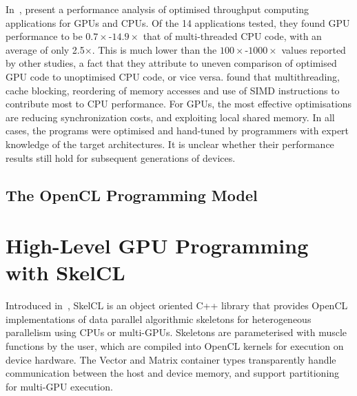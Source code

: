 In~\cite{Lee2010}, \citeauthor{Lee2010} present a performance analysis
of optimised throughput computing applications for GPUs and CPUs. Of
the 14 applications tested, they found GPU performance to be
$0.7\times$-$14.9\times$ that of multi-threaded CPU code, with an
average of only 2.5$\times$. This is much lower than the
$100\times$-$1000\times$ values reported by other studies,
a fact that they attribute to uneven comparison of optimised GPU code
to unoptimised CPU code, or vice versa. \citeauthor{Lee2010} found
that multithreading, cache blocking, reordering of memory accesses and
use of SIMD instructions to contribute most to CPU performance. For
GPUs, the most effective optimisations are reducing synchronization
costs, and exploiting local shared memory. In all cases, the programs
were optimised and hand-tuned by programmers with expert knowledge of
the target architectures. It is unclear whether their performance
results still hold for subsequent generations of devices.


\subsection{The OpenCL Programming Model}



\section{High-Level GPU Programming with SkelCL}

Introduced in~\cite{Steuwer2011}, SkelCL is an object oriented C++
library that provides OpenCL implementations of data parallel
algorithmic skeletons for heterogeneous parallelism using CPUs or
multi-GPUs. Skeletons are parameterised with muscle functions by the
user, which are compiled into OpenCL kernels for execution on device
hardware. The Vector and Matrix container types transparently handle
communication between the host and device memory, and support
partitioning for multi-GPU execution.


